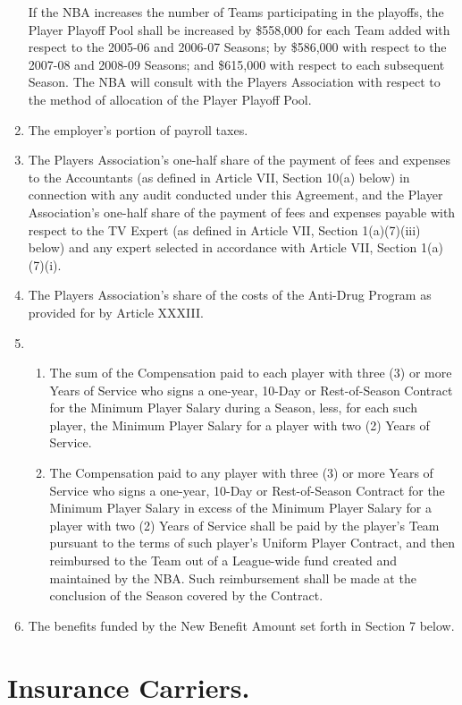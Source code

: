 \documentclass[
]{book}
\providecommand{\tightlist}{%
  \setlength{\itemsep}{0pt}\setlength{\parskip}{0pt}}
\begin{document}
\begin{enumerate}
  If the NBA increases the number of Teams participating in the playoffs, the Player Playoff Pool shall be increased by \$558,000 for each Team added with respect to the 2005-06 and 2006-07 Seasons; by \$586,000 with respect to the 2007-08 and 2008-09 Seasons; and \$615,000 with respect to each subsequent Season. The NBA will consult with the Players Association with respect to the method of allocation of the Player Playoff Pool.
\item
  The employer's portion of payroll taxes.
\item
  The Players Association's one-half share of the payment of fees and expenses to the Accountants (as defined in Article VII, Section 10(a) below) in connection with any audit conducted under this Agreement, and the Player Association's one-half share of the payment of fees and expenses payable with respect to the TV Expert (as defined in Article VII, Section 1(a)(7)(iii) below) and any expert selected in accordance with Article VII, Section 1(a)(7)(i).
\item
  The Players Association's share of the costs of the Anti-Drug Program as provided for by Article XXXIII.
\item
  \begin{enumerate}
  \def\labelenumii{(\arabic{enumii})}
  \tightlist
  \item
    The sum of the Compensation paid to each player with three (3) or more Years of Service who signs a one-year, 10-Day or Rest-of-Season Contract for the Minimum Player Salary during a Season, less, for each such player, the Minimum Player Salary for a player with two (2) Years of Service.
  \item
    The Compensation paid to any player with three (3) or more Years of Service who signs a one-year, 10-Day or Rest-of-Season Contract for the Minimum Player Salary in excess of the Minimum Player Salary for a player with two (2) Years of Service shall be paid by the player's Team pursuant to the terms of such player's Uniform Player Contract, and then reimbursed to the Team out of a League-wide fund created and maintained by the NBA. Such reimbursement shall be made at the conclusion of the Season covered by the Contract.
  \end{enumerate}
\item
  The benefits funded by the New Benefit Amount set forth in Section 7 below.
\end{enumerate}

\hypertarget{insurance-carriers.}{%
\section{Insurance Carriers.}\label{insurance-carriers.}}
\end{document}
